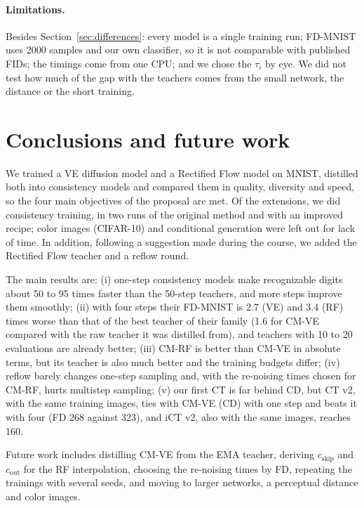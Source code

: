 \documentclass{article}
\begin{document}
\paragraph{Limitations.} Besides Section~\ref{sec:differences}: every model is
a single training run; FD-MNIST uses 2000 samples and our own classifier, so it is
not comparable with published FIDs; the timings come from one CPU; and we chose
the $\tau_i$ by eye. We did not test how much of the gap with the teachers comes
from the small network, the distance or the short training.

\section{Conclusions and future work}
\label{sec:conclusions}

We trained a VE diffusion model and a Rectified Flow model on MNIST, distilled
both into consistency models and compared them in quality, diversity and speed,
so the four main objectives of the proposal are met. Of the extensions, we did
consistency training, in two runs of the original method and with an improved recipe; color
images (CIFAR-10) and conditional generation were left out for lack of time. In
addition, following a suggestion made during the course, we added the Rectified
Flow teacher and a reflow round.

The main results are: (i) one-step consistency models make recognizable digits
about 50 to 95 times faster than the 50-step teachers, and more steps improve
them smoothly; (ii) with four steps their FD-MNIST is 2.7 (VE) and 3.4 (RF) times
worse than that of the best teacher of their family (1.6 for CM-VE compared with
the raw teacher it was distilled from), and teachers with 10 to 20 evaluations
are already better; (iii) CM-RF is better than CM-VE in absolute terms, but its
teacher is also much better and the training budgets differ; (iv) reflow barely
changes one-step sampling and, with the re-noising times chosen for CM-RF, hurts
multistep sampling; (v) our first CT is far behind CD, but CT v2, with the same
training images, ties with CM-VE (CD) with one step and beats it with four (FD 268
against 323), and iCT v2, also with the same images, reaches 160.

Future work includes distilling CM-VE from the EMA teacher, deriving $c_\text{skip}$ and $c_\text{out}$ for the RF
interpolation, choosing the re-noising times by FD, repeating the trainings with
several seeds, and moving to larger networks, a perceptual distance and color
images.
\end{document}
